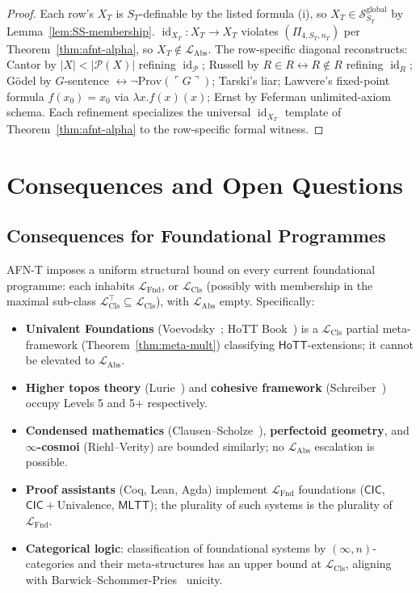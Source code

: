\documentclass[11pt]{article}
\theoremstyle{plain}
\theoremstyle{definition}
\newcommand{\cS}{\mathcal{S}}
\newcommand{\cP}{\mathcal{P}}
\newcommand{\LFnd}{\mathcal{L}_{\mathrm{Fnd}}}
\newcommand{\LCls}{\mathcal{L}_{\mathrm{Cls}}}
\newcommand{\LClsMax}{\mathcal{L}_{\mathrm{Cls}}^{\top}}
\newcommand{\LAbs}{\mathcal{L}_{\mathrm{Abs}}}
\newcommand{\MLTT}{\mathsf{MLTT}}
\newcommand{\HoTT}{\mathsf{HoTT}}
\newcommand{\CIC}{\mathsf{CIC}}
\DeclareMathOperator{\id}{id}
\begin{document}
\begin{proof}
Each row's $X_T$ is $S_T$-definable by the listed formula (i), so $X_T \in \cS_{S_T}^{\mathrm{global}}$ by Lemma~\ref{lem:SS-membership}. $\id_{X_T} : X_T \to X_T$ violates $(\Pi_{4, S_T, n_T})$ per Theorem~\ref{thm:afnt-alpha}, so $X_T \notin \LAbs$. The row-specific diagonal reconstructs: Cantor by $|X| < |\cP(X)|$ refining $\id_{\cP}$; Russell by $R \in R \leftrightarrow R \notin R$ refining $\id_R$; G\"odel by $G$-sentence $\leftrightarrow \neg\mathrm{Prov}(\ulcorner G \urcorner)$; Tarski's liar; Lawvere's fixed-point formula $f(x_0) = x_0$ via $\lambda x. f(x)(x)$; Ernst by Feferman unlimited-axiom schema. Each refinement specializes the universal $\id_{X_T}$ template of Theorem~\ref{thm:afnt-alpha} to the row-specific formal witness.
\end{proof}

\section{Consequences and Open Questions}\label{sec:consequences}

\subsection{Consequences for Foundational Programmes}

AFN-T imposes a uniform structural bound on every current foundational programme: each inhabits $\LFnd$, or $\LCls$ (possibly with membership in the maximal sub-class $\LClsMax \subseteq \LCls$), with $\LAbs$ empty. Specifically:
\begin{itemize}\setlength{\itemsep}{1pt}
\item \textbf{Univalent Foundations} (Voevodsky~\cite{VoevodskyFoundations2010}; HoTT Book~\cite{HoTTBook2013}) is a $\LCls$ partial meta-framework (Theorem~\ref{thm:meta-mult}) classifying $\HoTT$-extensions; it cannot be elevated to $\LAbs$.
\item \textbf{Higher topos theory} (Lurie~\cite{LurieHTT}) and \textbf{cohesive framework} (Schreiber~\cite{Schreiber2013}) occupy Levels 5 and 5+ respectively.
\item \textbf{Condensed mathematics} (Clausen--Scholze~\cite{ClausenScholze2019}), \textbf{perfectoid geometry}, and \textbf{$\infty$-cosmoi} (Riehl--Verity) are bounded similarly; no $\LAbs$ escalation is possible.
\item \textbf{Proof assistants} (Coq, Lean, Agda) implement $\LFnd$ foundations ($\CIC$, $\CIC + \mathrm{Univalence}$, $\MLTT$); the plurality of such systems is the plurality of $\LFnd$.
\item \textbf{Categorical logic}: classification of foundational systems by $(\infty, n)$-categories and their meta-structures has an upper bound at $\LCls$, aligning with Barwick--Schommer-Pries~\cite{BarwickSchommerPries2021} unicity.
\end{itemize}
\end{document}
